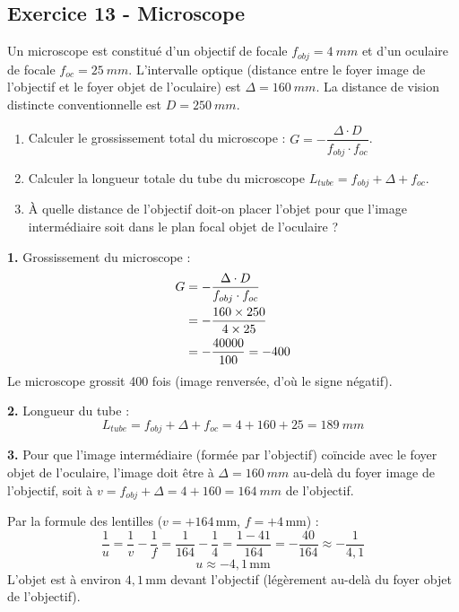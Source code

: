 \documentclass[12pt,a4paper]{article}
\begin{document}
\subsection*{Exercice 13 - Microscope \niveau{\difficile}}

\begin{boiteexercice}
Un microscope est constitué d'un objectif de focale $f_{obj} = \qty{4}{mm}$ et d'un oculaire de focale $f_{oc} = \qty{25}{mm}$. L'intervalle optique (distance entre le foyer image de l'objectif et le foyer objet de l'oculaire) est $\Delta = \qty{160}{mm}$. La distance de vision distincte conventionnelle est $D = \qty{250}{mm}$.
\begin{enumerate}
  \item Calculer le grossissement total du microscope : $G = -\dfrac{\Delta \cdot D}{f_{obj} \cdot f_{oc}}$.
  \item Calculer la longueur totale du tube du microscope $L_{tube} = f_{obj} + \Delta + f_{oc}$.
  \item À quelle distance de l'objectif doit-on placer l'objet pour que l'image intermédiaire soit dans le plan focal objet de l'oculaire ?
\end{enumerate}
\end{boiteexercice}

\begin{boitecorrige}
\textbf{1.} Grossissement du microscope :
\begin{align}
G &= -\frac{\Delta \cdot D}{f_{obj} \cdot f_{oc}} \notag \\
&= -\frac{160 \times 250}{4 \times 25} \notag \\
&= -\frac{40000}{100} = -400
\end{align}
Le microscope grossit 400 fois (image renversée, d'où le signe négatif).

\textbf{2.} Longueur du tube :
\[
L_{tube} = f_{obj} + \Delta + f_{oc} = 4 + 160 + 25 = \qty{189}{mm}
\]

\textbf{3.} Pour que l'image intermédiaire (formée par l'objectif) coïncide avec le foyer objet de l'oculaire, l'image doit être à $\Delta = \qty{160}{mm}$ au-delà du foyer image de l'objectif, soit à $v = f_{obj} + \Delta = 4 + 160 = \qty{164}{mm}$ de l'objectif.

Par la formule des lentilles ($v = +164\,\text{mm}$, $f = +4\,\text{mm}$) :
\[
\frac{1}{u} = \frac{1}{v} - \frac{1}{f} = \frac{1}{164} - \frac{1}{4} = \frac{1 - 41}{164} = -\frac{40}{164} \approx -\frac{1}{4{,}1}
\]
\[
u \approx -4{,}1\,\text{mm}
\]
L'objet est à environ $4{,}1\,\text{mm}$ devant l'objectif (légèrement au-delà du foyer objet de l'objectif).
\end{boitecorrige}
\end{document}
